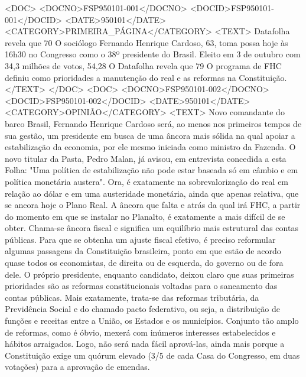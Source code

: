<DOC>
<DOCNO>FSP950101-001</DOCNO>
<DOCID>FSP950101-001</DOCID>
<DATE>950101</DATE>
<CATEGORY>PRIMEIRA_PÁGINA</CATEGORY>
<TEXT>
Datafolha revela que 70%
O sociólogo Fernando Henrique Cardoso, 63, toma possa hoje às 16h30 no Congresso como o 38º presidente do Brasil. Eleito em 3 de outubro com 34,3 milhões de votos, 54,28%
O Datafolha revela que 79%
O programa de FHC definiu como prioridades a manutenção do real e as reformas na Constituição. 
</TEXT>
</DOC>
<DOC>
<DOCNO>FSP950101-002</DOCNO>
<DOCID>FSP950101-002</DOCID>
<DATE>950101</DATE>
<CATEGORY>OPINIÃO</CATEGORY>
<TEXT>
Novo comandante do barco Brasil, Fernando Henrique Cardoso será, ao menos nos primeiros tempos de sua gestão, um presidente em busca de uma âncora mais sólida na qual apoiar a estabilização da economia, por ele mesmo iniciada como ministro da Fazenda.
O novo titular da Pasta, Pedro Malan, já avisou, em entrevista concedida a esta Folha: "Uma política de estabilização não pode estar baseada só em câmbio e em política monetária austera".
Ora, é exatamente na sobrevalorização do real em relação ao dólar e em uma austeridade monetária, ainda que apenas relativa, que se ancora hoje o Plano Real.
A âncora que falta e atrás da qual irá FHC, a partir do momento em que se instalar no Planalto, é exatamente a mais difícil de se obter. Chama-se âncora fiscal e significa um equilíbrio mais estrutural das contas públicas.
Para que se obtenha um ajuste fiscal efetivo, é preciso reformular algumas passagens da Constituição brasileira, ponto em que estão de acordo quase todos os economistas, de direita ou de esquerda, do governo ou de fora dele.
O próprio presidente, enquanto candidato, deixou claro que suas primeiras prioridades são as reformas constitucionais voltadas para o saneamento das contas públicas.
Mais exatamente, trata-se das reformas tributária, da Previdência Social e do chamado pacto federativo, ou seja, a distribuição de funções e receitas entre a União, os Estados e os municípios.
Conjunto tão amplo de reformas, como é óbvio, mexerá com inúmeros interesses estabelecidos e hábitos arraigados. Logo, não será nada fácil aprová-las, ainda mais porque a Constituição exige um quórum elevado (3/5 de cada Casa do Congresso, em duas votações) para a aprovação de emendas.
